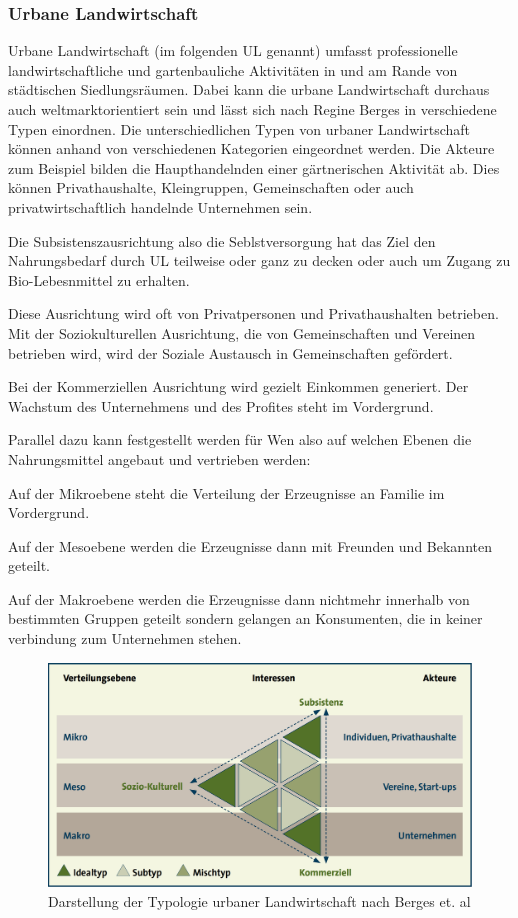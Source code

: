 \documentclass{scrartcl}
\begin{document}
\subsubsection{Urbane Landwirtschaft}
Urbane Landwirtschaft (im folgenden UL genannt) umfasst professionelle landwirtschaftliche und gartenbauliche Aktivitäten in und am Rande von städtischen Siedlungsräumen. Dabei kann die urbane Landwirtschaft durchaus auch weltmarktorientiert sein und lässt sich nach Regine Berges in verschiedene Typen einordnen. Die unterschiedlichen Typen von urbaner Landwirtschaft können anhand von verschiedenen Kategorien eingeordnet werden. Die Akteure zum Beispiel bilden die Haupthandelnden einer gärtnerischen Aktivität ab. Dies können Privathaushalte, Kleingruppen, Gemeinschaften oder auch privatwirtschaftlich handelnde Unternehmen sein. 

\item Die Subsistenszausrichtung also die Seblstversorgung hat das Ziel den Nahrungsbedarf durch UL teilweise oder ganz zu decken oder auch um Zugang zu Bio-Lebesnmittel zu erhalten. 
\item Diese Ausrichtung wird oft von Privatpersonen und Privathaushalten betrieben. Mit der Soziokulturellen Ausrichtung, die von Gemeinschaften und Vereinen betrieben wird, wird der Soziale Austausch in Gemeinschaften gefördert. 
\item Bei der Kommerziellen Ausrichtung wird gezielt Einkommen generiert. Der Wachstum des Unternehmens und des Profites steht im Vordergrund. 

Parallel dazu kann festgestellt werden für Wen also auf welchen Ebenen die Nahrungsmittel angebaut und vertrieben werden:

\item Auf der Mikroebene steht die Verteilung der Erzeugnisse an Familie im Vordergrund.
\item Auf der Mesoebene werden die Erzeugnisse dann mit Freunden und Bekannten geteilt.
\item Auf der Makroebene werden die Erzeugnisse dann nichtmehr innerhalb von bestimmten Gruppen geteilt sondern gelangen an Konsumenten, die in keiner 
verbindung zum Unternehmen stehen. 


\begin{figure}[h]
\centering
\includegraphics[width=12cm]{image_folder/ul_typologie.png}
\caption{Darstellung der Typologie urbaner Landwirtschaft nach Berges et. al\footnotemark}
\label{fig:ul_typologie}
\end{figure}
\end{document}
